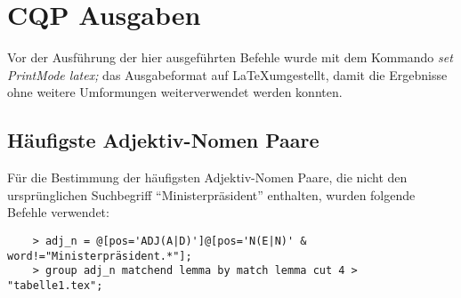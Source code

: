 \documentclass[%
	type=document,%
  	style=article,%
  	media=print,
  	pages=oneside,%
  	prefixLecturer=Dozenten:,
  	author=multiple,
]{unihildesheim}
\begin{document}
\Titlepage
\cleardoublepage
\TOC
\cleardoublepage

%






\section{CQP Ausgaben}

Vor der Ausführung der hier ausgeführten Befehle wurde mit dem Kommando
\textit{set PrintMode latex;} das Ausgabeformat auf \LaTeX umgestellt, damit die
Ergebnisse ohne weitere Umformungen weiterverwendet werden konnten.


\subsection{Häufigste Adjektiv-Nomen Paare}
Für die Bestimmung der häufigsten Adjektiv-Nomen Paare, die nicht den
ursprünglichen Suchbegriff "`Ministerpräsident"' enthalten, wurden folgende
Befehle verwendet:
\begin{verbatim}
	> adj_n = @[pos='ADJ(A|D)']@[pos='N(E|N)' & word!="Ministerpräsident.*"];
	> group adj_n matchend lemma by match lemma cut 4 > "tabelle1.tex";
\end{verbatim}
\end{document}
